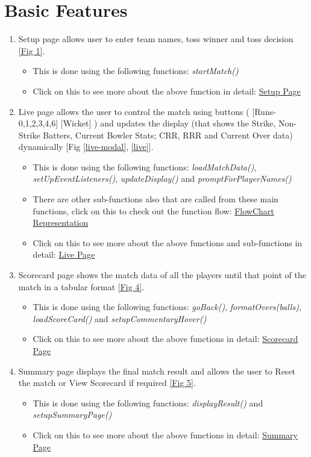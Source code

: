 \documentclass[a4paper,12pt]{article}
\begin{document}
\section{Basic Features}
\begin{enumerate}
\item Setup page allows user to enter team names, toss winner and toss decision \hyperref[homepage]{[Fig 1]}.
  \begin{itemize}
  \item This is done using the following functions: \textit{startMatch()}
  \item Click on this to see more about the above function in detail: \hyperref[basic1]{Setup Page}
  \end{itemize}
\item Live page allows the user to control the match using buttons ( [Runs-0,1,2,3,4,6] [Wicket] ) and updates the display (that shows the Strike, Non-Strike Batters, Current Bowler Stats; CRR, RRR and Current Over data) dynamically [Fig \ref{live-modal}, \ref{live}].
  \begin{itemize}
  \item This is done using the following functions: \textit{loadMatchData()}, \textit{setUpEventListeners()}, \textit{updateDisplay()} and \textit{promptForPlayerNames()}
  \item There are other sub-functions also that are called from these main functions, click on this to check out the function flow: \hyperref[flowchart]{FlowChart Representation}
  \item Click on this to see more about the above functions and sub-functions in detail: \hyperref[basic2]{Live Page}
  \end{itemize}
\item Scorecard page shows the match data of all the players until that point of the match in a tabular format \hyperref[scorecard]{[Fig 4]}.
  \begin{itemize}
  \item This is done using the following functions: \textit{goBack()}, \textit{formatOvers(balls)}, \textit{loadScoreCard()} and \textit{setupCommentaryHover()}
  \item Click on this to see more about the above functions in detail: \hyperref[basic3]{Scorecard Page}
  \end{itemize}
\item Summary page displays the final match result and allows the user to Reset the match or View Scorecard if required \hyperref[summary]{[Fig 5]}.
  \begin{itemize}
  \item This is done using the following functions: \textit{displayResult()} and \textit{setupSummaryPage()}
  \item Click on this to see more about the above functions in detail: \hyperref[basic4]{Summary Page}
  \end{itemize}
\end{enumerate}
\end{document}
